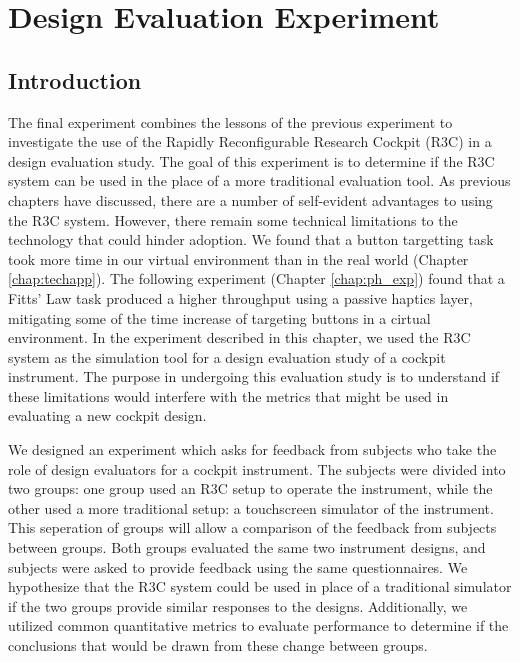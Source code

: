 \chapter{Design Evaluation Experiment}
\label{chap:de_exp}

\section{Introduction}

The final experiment combines the lessons of the previous experiment to investigate the use of the Rapidly Reconfigurable Research Cockpit (R3C) in a design evaluation study.
The goal of this experiment is to determine if the R3C system can be used in the place of a more traditional evaluation tool.
As previous chapters have discussed, there are a number of self-evident advantages to using the R3C system.
However, there remain some technical limitations to the technology that could hinder adoption.
We found that a button targetting task took more time in our virtual environment than in the real world (Chapter \ref{chap:techapp}).
The following experiment (Chapter \ref{chap:ph_exp}) found that a Fitts' Law task produced a higher throughput using a passive haptics layer, mitigating some of the time increase of targeting buttons in a cirtual environment.
In the experiment described in this chapter, we used the R3C system as the simulation tool for a design evaluation study of a cockpit instrument.
The purpose in undergoing this evaluation study is to understand if these limitations would interfere with the metrics that might be used in evaluating a new cockpit design.

We designed an experiment which asks for feedback from subjects who take the role of design evaluators for a cockpit instrument.
The subjects were divided into two groups: one group used an R3C setup to operate the instrument, while the other used a more traditional setup: a touchscreen simulator of the instrument.
This seperation of groups will allow a comparison of the feedback from subjects between groups.
Both groups evaluated the same two instrument designs, and subjects were asked to provide feedback using the same questionnaires.
We hypothesize that the R3C system could be used in place of a traditional simulator if the two groups provide similar responses to the designs.
Additionally, we utilized common quantitative metrics to evaluate performance to determine if the conclusions that would be drawn from these change between groups.

